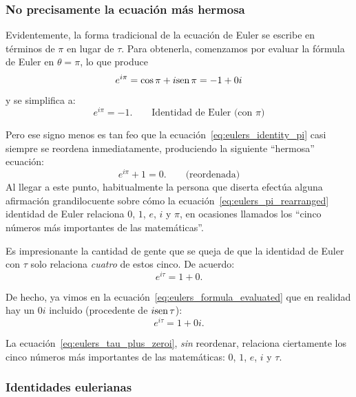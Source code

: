     \subsubsection{No precisamente la ecuación más hermosa} %
    \label{sec:not_the_most_beautiful_equation}

Evidentemente, la forma tradicional de la ecuación de Euler se escribe en términos de $\pi$ en lugar de $\tau$. Para obtenerla, comenzamos por evaluar la fórmula de Euler en $\theta = \pi$, lo que produce
\begin{equation}
e^{i\pi} = \cos\pi + i\mbox{sen}\,\pi = -1 + 0i
\end{equation}
y se simplifica a:
\begin{equation}
  \label{eq:eulers_identity_pi}
  e^{i\pi} = -1. \qquad\mbox{Identidad de Euler (con $\pi$)}
\end{equation}


Pero ese signo menos es tan feo que la ecuación~\eqref{eq:eulers_identity_pi} casi siempre se reordena inmediatamente, produciendo la siguiente ``hermosa'' ecuación:
\begin{equation}
\label{eq:eulers_pi_rearranged}
e^{i\pi} + 1 = 0. \qquad\mbox{(reordenada)}
\end{equation}
Al llegar a este punto, habitualmente la persona que diserta efectúa alguna afirmación grandilocuente sobre cómo la ecuación~\eqref{eq:eulers_pi_rearranged} identidad de Euler relaciona $0$, $1$, $e$, $i$ y $\pi$, en ocasiones llamados los ``cinco números más importantes de las matemáticas''. 

Es impresionante la cantidad de gente que se queja de que la identidad de Euler con $\tau$ solo relaciona \emph{cuatro} de estos cinco. De acuerdo:
\begin{equation} 
  \label{eq:eulers_tau_plus_zero}
e^{i\tau} = 1 + 0.
\end{equation}

De hecho, ya vimos en la ecuación~\eqref{eq:eulers_formula_evaluated} que en realidad hay un $0i$ incluido (procedente de $i\mbox{sen}\,\tau$):
\begin{equation}
  \label{eq:eulers_tau_plus_zeroi}
  e^{i\tau} = 1 + 0i.
\end{equation}

La ecuación~\eqref{eq:eulers_tau_plus_zeroi}, \emph{sin} reordenar, relaciona ciertamente los cinco números más importantes de las matemáticas: $0$, $1$, $e$, $i$ y $\tau$.

      \subsubsection{Identidades eulerianas} %
      \label{sec:eulerian_identities}

